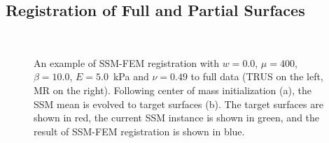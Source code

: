 \documentclass[journal]{IEEEtran}
\begin{document}
\subsection{Registration of Full and Partial Surfaces}\label{sec:exp1}
\begin{figure}[t]
	\centering
	\\
	\caption{An example of SSM-FEM registration with $w=0.0$, $\mu=400$, $\beta=10.0$, $E=5.0$~kPa and $\nu=0.49$ to full data (TRUS on the left, MR on the right).  Following center of mass initialization (a), the SSM mean is evolved to target surfaces (b). The target surfaces are shown in red, the current SSM instance is shown in green, and the result of SSM-FEM registration is shown in blue.}\label{fig:RegFull}
\end{figure}
\end{document}
